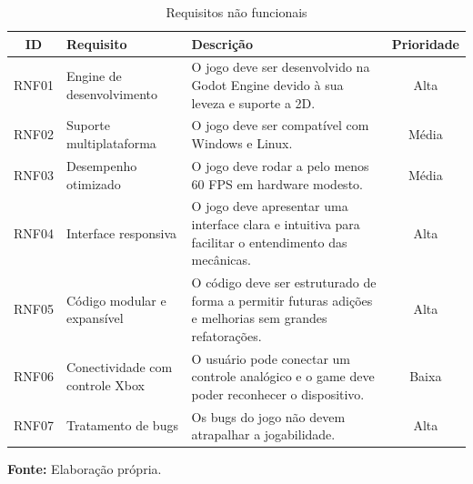 \begin{table}[H]
\centering
\caption{Requisitos não funcionais}
\label{tab:requisitos-nao-funcionais}
\begin{tabular}{|c|p{4cm}|p{6cm}|c|}
\hline
\textbf{ID} & \textbf{Requisito} & \textbf{Descrição} & \textbf{Prioridade} \\
\hline
RNF01 & Engine de desenvolvimento & O jogo deve ser desenvolvido na Godot Engine devido à sua leveza e suporte a 2D. & Alta \\
\hline
RNF02 & Suporte multiplataforma & O jogo deve ser compatível com Windows e Linux. & Média \\
\hline
RNF03 & Desempenho otimizado & O jogo deve rodar a pelo menos 60 FPS em hardware modesto. & Média \\
\hline
RNF04 & Interface responsiva & O jogo deve apresentar uma interface clara e intuitiva para facilitar o entendimento das mecânicas. & Alta \\
\hline
RNF05 & Código modular e expansível & O código deve ser estruturado de forma a permitir futuras adições e melhorias sem grandes refatorações. & Alta \\
\hline
RNF06 & Conectividade com controle Xbox & O usuário pode conectar um controle analógico e o game deve poder reconhecer o dispositivo. & Baixa \\
\hline
RNF07 & Tratamento de bugs & Os bugs do jogo não devem atrapalhar a jogabilidade. & Alta \\
\hline
\end{tabular}

\vspace{0.3em}
\small \textbf{Fonte:} Elaboração própria.
\end{table}


